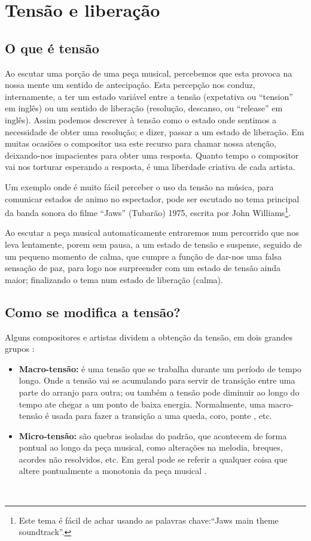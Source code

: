 \section{Tensão e liberação }

\subsection{O que é tensão}
Ao escutar uma porção de uma peça musical, percebemos que esta provoca na nossa mente
um sentido de antecipação.
Esta percepção nos conduz, internamente, 
a ter um estado variável entre a tensão (expetativa ou ``tension'' em inglês)
ou um sentido de liberação (resolução, descanso, ou ``release'' em inglês).
Assim podemos descrever à tensão como o 
estado onde sentimos a necessidade de obter uma resolução; e dizer, passar a um estado de liberação.
Em muitas ocasiões o compositor usa este recurso para chamar nossa atenção,
deixando-nos impacientes para obter uma resposta. 
Quanto tempo o compositor vai nos torturar esperando a resposta, 
é uma liberdade criativa de cada artista.

\begin{example}
Um exemplo onde é muito fácil perceber o uso da tensão na música, 
para comunicar estados de animo no espectador, 
pode ser escutado no tema principal da banda sonora do filme ``Jaws'' (Tubarão) 1975,
escrita por John Williams\footnote{Este tema é fácil de achar usando as palavras chave:``Jaws main theme soundtrack''.}.

Ao escutar a peça musical automaticamente entraremos num percorrido que nos leva lentamente,
porem sem pausa, a um estado de tensão e suspense, seguido de um pequeno momento de calma,
que cumpre a função de dar-nos uma falsa sensação de paz,
 para logo nos surpreender com um estado de tensão ainda maior;
finalizando o tema num estado de liberação (calma).
\end{example}

\subsection{Como se modifica a tensão?}

Alguns compositores e artistas dividem a obtenção da tensão, em dois grandes grupos \cite{edmtensionrelease1}:
\begin{itemize}
\item \textbf{Macro-tensão:}
é uma tensão que se trabalha durante um período de tempo longo. 
Onde a tensão vai se acumulando para servir de transição entre uma parte do arranjo para outra;
ou também a tensão pode diminuir ao longo do tempo ate chegar a um ponto de baixa energia.
Normalmente, uma macro-tensão é usada para fazer a transição a uma queda, coro, ponte \cite{edmtensionrelease1}, etc.
\item \textbf{Micro-tensão:}
são  quebras isoladas do padrão, que acontecem de forma pontual ao longo da peça musical, 
como alterações na melodia, breques, acordes não resolvidos, etc. 
Em geral pode se referir a qualquer coisa que altere pontualmente a monotonia da peça musical \cite{edmtensionrelease1}.
\end{itemize}~

